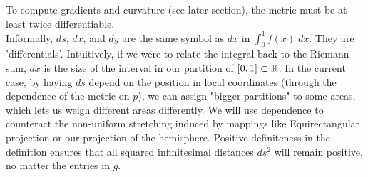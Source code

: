 To compute gradients and curvature (see later section), the metric must be at least twice differentiable. \\
Informally, $ds$, $dx$, and $dy$ are the same symbol as $dx$ in $\int_0^1 f(x) \;dx$. They are 'differentials'. Intuitively, if we were to relate the integral back to the Riemann sum, $dx$ is the size of the interval in our partition of $[0, 1] \subset \mathbb{R}$. In the current case, by having $ds$ depend on the position in local coordinates (through the dependence of the metric on $p$), we can assign "bigger partitions" to some areas, which lets us weigh different areas differently. We will use dependence to counteract the non-uniform stretching induced by mappings like Equirectangular projection or our projection of the hemisphere. Positive-definiteness in the definition ensures that all squared infinitesimal distances $ds^2$ will remain positive, no matter the entries in $g$.
